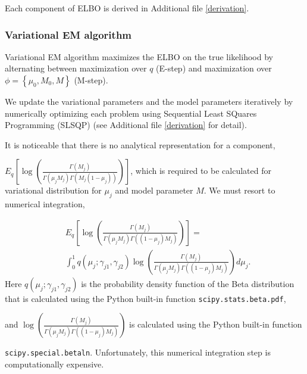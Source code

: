 \documentclass{bmcart}
\begin{document}
Each component of ELBO is derived in Additional file \ref{derivation}.


\subsubsection{Variational EM algorithm}
Variational EM algorithm maximizes the ELBO on the true likelihood by alternating between maximization over $q$ (E-step) and maximization over $\phi= \left\{\mu_0, M_0, M \right\}$ (M-step).

We update the variational parameters and the model parameters iteratively by numerically optimizing each problem using Sequential Least SQuares Programming (SLSQP) \cite{kraft1988software} (see Additional file \ref{derivation} for detail).

It is noticeable that there is no analytical representation for a component, 

$ E_q\left[ \log \left( \frac{ \Gamma(M_j) } { \Gamma(\mu_j M_j) \Gamma(M_j (1-\mu_j)) }\right)\right] $,
which is required to be calculated for variational distribution for $\mu_j$ and model parameter $M$.
We must resort to numerical integration,

\begin{equation}\label{eqn:integration}
\begin{split}
& E_q\left[ \log \left( \frac{ \Gamma(M_j) } { \Gamma(\mu_j M_j) \Gamma((1-\mu_j)M_j ) }\right)\right] =\\
& \int_{0}^{1} q(\mu_j;\gamma_{j1}, \gamma_{j2}) \log \left( \frac{ \Gamma(M_j) } { \Gamma(\mu_j M_j) \Gamma((1-\mu_j)M_j ) }\right) d\mu_j.
\end{split}
\end{equation}
Here $q(\mu_j;\gamma_{j1}, \gamma_{j2})$ is the probability density function of the Beta distribution that is calculated using the Python built-in function \texttt{scipy.stats.beta.pdf},

and $\log \left( \frac{ \Gamma(M_j) } { \Gamma(\mu_j M_j) \Gamma((1-\mu_j)M_j ) }\right)$ is calculated using the Python built-in function

\texttt{scipy.special.betaln}.
Unfortunately, this numerical integration step is computationally expensive.
\end{document}
